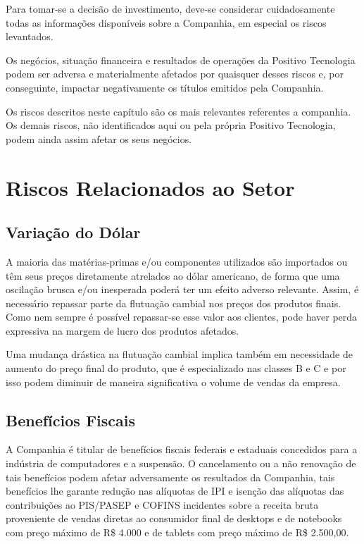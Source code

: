 Para tomar-se a decisão de investimento, deve-se considerar cuidadosamente todas as informações disponíveis sobre a Companhia, em especial os riscos levantados.

Os negócios, situação financeira e resultados de operações da Positivo Tecnologia podem ser adversa e materialmente afetados por quaisquer desses riscos e, por conseguinte, impactar negativamente os títulos emitidos pela Companhia.

Os riscos descritos neste capítulo são os mais relevantes referentes a companhia. Os demais riscos, não identificados aqui ou pela própria Positivo Tecnologia, podem ainda assim afetar os seus negócios.

\section{Riscos Relacionados ao Setor}

\subsection{Variação do Dólar} A maioria das matérias-primas e/ou componentes utilizados são importados ou têm seus preços diretamente atrelados ao dólar americano, de forma que uma oscilação brusca e/ou inesperada poderá ter um efeito adverso relevante. Assim, é necessário repassar parte da flutuação cambial nos preços dos produtos finais. Como nem sempre é possível repassar-se esse valor aos clientes, pode haver perda expressiva na margem de lucro dos produtos afetados.

Uma mudança drástica na flutuação cambial implica também em necessidade de aumento do preço final do produto, que é especializado nas classes B e C e por isso podem diminuir de maneira significativa o volume de vendas da empresa.

\subsection{Benefícios Fiscais} 
A Companhia é titular de benefícios fiscais federais e estaduais concedidos para a indústria de computadores e a suspensão. O cancelamento ou a não renovação de tais benefícios podem afetar adversamente os resultados da Companhia, tais benefícios lhe garante redução nas alíquotas de IPI e isenção das alíquotas das contribuições ao PIS/PASEP e COFINS incidentes sobre a receita bruta proveniente de vendas diretas ao consumidor final de desktops e de notebooks com preço máximo de R\$ 4.000 e de tablets com preço máximo de R\$ 2.500,00.

